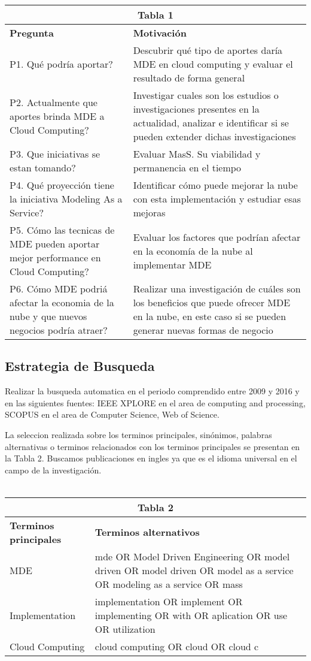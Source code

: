 \documentclass{llncs}
\begin{document}
\begin{tabular}{  | p{5cm} | p{7cm}  | }
  \hline
  \multicolumn{2}{|c|}{\bf Tabla 1} \\
  \hline
  \bf Pregunta & \bf Motivación \\
  \hline
  P1. Qué podría aportar?  & Descubrir qué tipo de aportes daría MDE en cloud computing y evaluar el resultado de forma general\\
  \hline
  P2. Actualmente que aportes brinda MDE a Cloud Computing? & Investigar cuales son los estudios o investigaciones presentes en la actualidad, analizar e identificar si se pueden extender dichas investigaciones\\
  \hline
  P3. Que iniciativas se estan tomando? & Evaluar MasS. Su viabilidad y permanencia en el tiempo\\
  \hline
  P4. Qué proyección tiene la iniciativa Modeling As a Service? & Identificar cómo puede mejorar la nube con esta implementación y estudiar esas mejoras\\
  \hline
  P5. Cómo las tecnicas de MDE pueden aportar mejor performance en Cloud Computing?  & Evaluar los factores que podrían afectar en la economía de la nube al implementar MDE\\
  \hline
  P6. Cómo MDE podriá afectar la economia de la nube y que nuevos negocios podría atraer? & Realizar una investigación de cuáles son los beneficios que puede ofrecer MDE en la nube, en este caso si se pueden generar nuevas formas de negocio\\
  \hline
\end{tabular}

\subsection{Estrategia de Busqueda}
Realizar la busqueda automatica  en el periodo comprendido entre 2009 y 2016 y en las siguientes fuentes: IEEE XPLORE en el area de computing and processing, SCOPUS en el area de Computer Science, Web of Science.

La seleccion realizada sobre los terminos principales, sinónimos, palabras alternativas o terminos relacionados con los terminos principales se presentan en la Tabla 2. Buscamos publicaciones en ingles ya que es el idioma universal en el campo de la investigación.\\ \\
\begin{tabular}{  | p{5cm} | p{7cm}  | }
  \hline
  \multicolumn{2}{|c|}{\bf Tabla 2} \\
  \hline
  \bf Terminos principales & \bf Terminos alternativos \\
  \hline
    MDE & mde OR Model Driven Engineering OR model driven OR model driven OR model as a service OR modeling as a service OR mass\\
   \hline
    Implementation & implementation OR implement OR implementing OR with OR aplication OR use OR utilization\\
   \hline
   Cloud Computing & cloud computing OR  cloud OR cloud c\\
   \hline
\end{tabular}\\ \\
\pagebreak
\end{document}
